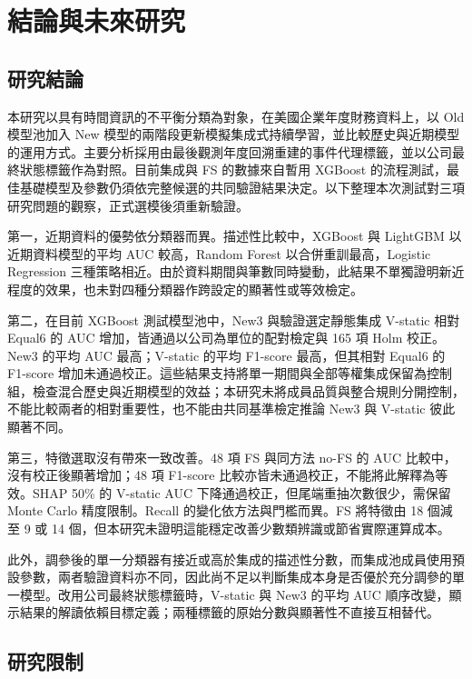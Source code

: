 \chapter{結論與未來研究}\label{chap:conclusion}
\begingroup
\setlength{\emergencystretch}{2em}

\section{研究結論}

本研究以具有時間資訊的不平衡分類為對象，在美國企業年度財務資料上，以 Old 模型池加入 New 模型的兩階段更新模擬集成式持續學習，並比較歷史與近期模型的運用方式。主要分析採用由最後觀測年度回溯重建的事件代理標籤，並以公司最終狀態標籤作為對照。目前集成與 FS 的數據來自暫用 XGBoost 的流程測試，最佳基礎模型及參數仍須依完整候選的共同驗證結果決定。以下整理本次測試對三項研究問題的觀察，正式選模後須重新驗證。

第一，近期資料的優勢依分類器而異。描述性比較中，XGBoost 與 LightGBM 以近期資料模型的平均 AUC 較高，Random Forest 以合併重訓最高，Logistic Regression 三種策略相近。由於資料期間與筆數同時變動，此結果不單獨證明新近程度的效果，也未對四種分類器作跨設定的顯著性或等效檢定。

第二，在目前 XGBoost 測試模型池中，New3 與驗證選定靜態集成 V-static 相對 Equal6 的 AUC 增加，皆通過以公司為單位的配對檢定與 165 項 Holm 校正。New3 的平均 AUC 最高；V-static 的平均 F1-score 最高，但其相對 Equal6 的 F1-score 增加未通過校正。這些結果支持將單一期間與全部等權集成保留為控制組，檢查混合歷史與近期模型的效益；本研究未將成員品質與整合規則分開控制，不能比較兩者的相對重要性，也不能由共同基準檢定推論 New3 與 V-static 彼此顯著不同。

第三，特徵選取沒有帶來一致改善。48 項 FS 與同方法 no-FS 的 AUC 比較中，沒有校正後顯著增加；48 項 F1-score 比較亦皆未通過校正，不能將此解釋為等效。SHAP 50\% 的 V-static AUC 下降通過校正，但尾端重抽次數很少，需保留 Monte Carlo 精度限制。Recall 的變化依方法與門檻而異。FS 將特徵由 18 個減至 9 或 14 個，但本研究未證明這能穩定改善少數類辨識或節省實際運算成本。

此外，調參後的單一分類器有接近或高於集成的描述性分數，而集成池成員使用預設參數，兩者驗證資料亦不同，因此尚不足以判斷集成本身是否優於充分調參的單一模型。改用公司最終狀態標籤時，V-static 與 New3 的平均 AUC 順序改變，顯示結果的解讀依賴目標定義；兩種標籤的原始分數與顯著性不直接互相替代。

\section{研究限制}


